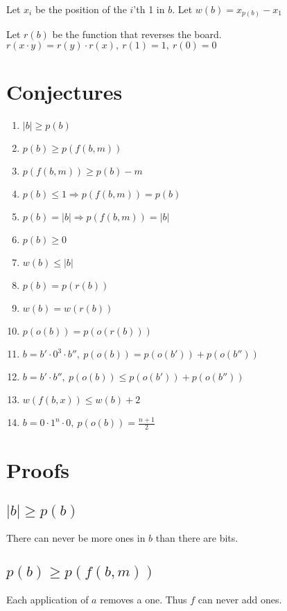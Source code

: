 \documentclass{article}
\begin{document}
\vspace{\baselineskip}
\noindent
Let $x_i$ be the position of the $i$'th 1 in $b$. 
Let $w(b) = x_{p(b)}-x_1$

\vspace{\baselineskip}
\noindent
Let $r(b)$ be the function that reverses the board. $r(x\cdot y)=r(y) \cdot r(x),\ r(1) = 1,\ r(0) = 0$


\section{Conjectures}
\begin{enumerate}
    \item $|b|\ge p(b)$
    \item $p(b)\ge p(f(b,m))$
    \item $p(f(b,m))\ge p(b)-m$
    \item $p(b) \le 1 \Rightarrow p(f(b,m)) = p(b)$
    \item $p(b) = |b| \Rightarrow p(f(b,m)) = |b|$
    \item $p(b)\ge 0$
    \item $w(b)\le |b|$ 
    \item $p(b) = p(r(b))$
    \item $w(b) = w(r(b))$
    \item $p(o(b)) = p(o(r(b)))$
    \item $b = b'\cdot 0^3\cdot b'',\ p(o(b)) = p(o(b'))+p(o(b''))$
    \item $b = b'\cdot b'',\ p(o(b)) \le p(o(b'))+p(o(b''))$
    \item $w(f(b,x))\le w(b)+2$ 
    \item $b=0\cdot 1^n\cdot 0,\ p(o(b)) = \frac{n+1}{2}$ 
\end{enumerate}

\section{Proofs}
\subsection{$|b|\ge p(b)$}
There can never be more ones in $b$ than there are bits. 

\subsection{$p(b)\ge p(f(b,m))$}
Each application of $a$ removes a one. Thus $f$ can never add ones. 
\end{document}
